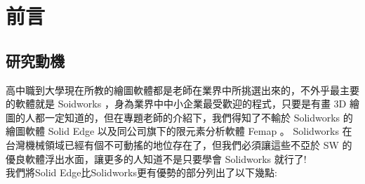 \chapter{前言}
\renewcommand{\baselinestretch}{10.0} %
\setcounter{page}{1}  %
\fontsize{14pt}{2.5pt}\sectionef
\section{研究動機}
高中職到大學現在所教的繪圖軟體都是老師在業界中所挑選出來的，不外乎最主要的軟體就是 Soidworks ，身為業界中中小企業最受歡迎的程式，只要是有畫 3D 繪圖的人都一定知道的，但在專題老師的介紹下，我們得知了不輸於 Solidworks 的繪圖軟體 Solid Edge 以及同公司旗下的限元素分析軟體 Femap 。 Solidworks 在台灣機械領域已經有個不可動搖的地位存在了，但我們必須讓這些不亞於 SW 的優良軟體浮出水面，讓更多的人知道不是只要學會 Solidworks 就行了!\\
我們將Solid Edge比Solidworks更有優勢的部分列出了以下幾點:
